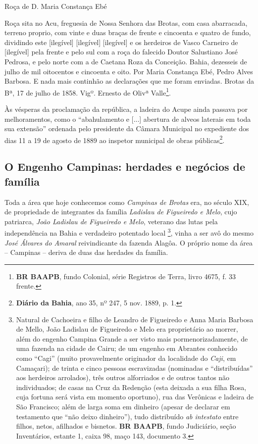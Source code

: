 \begin{citacao}
Roça de D. Maria Constança Ebé

Roça sita no Acu, freguesia de Nossa Senhora das Brotas, com casa abarracada, terreno proprio, com vinte e duas braças de frente e cincoenta e quatro de fundo, dividindo este [ilegível] [ilegível] [ilegível] e os herdeiros de Vasco Carneiro de [ilegível] pela frente e pelo sul com a roça do falecido Doutor Salustiano José Pedrosa, e pelo norte com a de Caetana Roza da Conceição. Bahia, dezesseis de julho de mil oitocentos e cincoenta e oito. Por Maria Constança Ebé, Pedro Alves Barbosa. E nada mais continhão as declarações que me foram enviadas. Brotas da Bª, 17 de julho de 1858. Vigº. Ernesto de Olivª Valle\footnote{\textbf{BR BAAPB}, fundo Colonial, série Registros de Terra, livro 4675, f. 33 frente.}.

Às vésperas da proclamação da república, a ladeira do Acupe ainda passava por melhoramentos, como o ``abahulamento e [...] abertura de alveos laterais em toda sua extensão'' ordenada pelo presidente da Câmara Municipal no expediente dos dias 11 a 19 de agosto de 1889 ao inspetor municipal de obras públicas\footnote{\textbf{Diário da Bahia}, ano 35, nº 247, 5 nov. 1889, p. 1.}.

\end{citacao}

\subsection{O Engenho Campinas: herdades e negócios de família}\label{subsec:campinasladislau}

Toda a área que hoje conhecemos como \textit{Campinas de Brotas} era, no século XIX, de propriedade de integrantes da família \textit{Ladislau de Figueiredo e Melo}, cujo patriarca, \textit{João Ladislau de Figueiredo e Melo}, veterano das lutas pela independência na Bahia e verdadeiro potentado local \cite[p.~59]{REISSILVA1989}\footnote{Natural de Cachoeira e filho de Leandro de Figueiredo e Anna Maria Barbosa de Mello, João Ladislau de Figueiredo e Melo era proprietário ao morrer, além do engenho Campina Grande a ser visto mais pormenorizadamente, de uma fazenda na cidade de Cairu; de um engenho em Abrantes conhecido como ``Cagi'' (muito provavelmente originador da localidade do \textit{Caji}, em Camaçari); de trinta e cinco pessoas escravizadas (nominadas e ``distribuídas'' aos herdeiros arrolados), três outros alforriados e de outros tantos não individuados; de casas na Cruz da Redenção (esta deixada a sua filha Rosa, cuja fortuna será vista em momento oportuno), rua das Verônicas e ladeira de São Francisco; além de larga soma em dinheiro (apesar de declarar em testamento que ``não deixo dinheiro''), tudo distribuído \textit{ab intestato} entre filhos, netos, afilhados e bisnetos. \textbf{BR BAAPB}, fundo Judiciário, seção Inventários, estante 1, caixa 98, maço 143, documento 3.}, vinha a ser avô do mesmo \textit{José Álvares do Amaral} reivindicante da fazenda Alagôa. O próprio nome da área -- Campinas -- deriva de duas das herdades da família.

